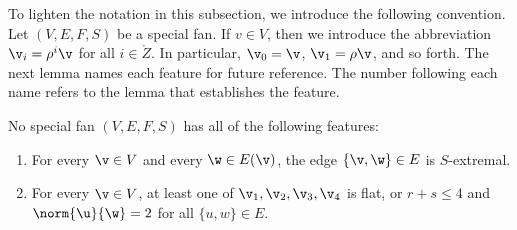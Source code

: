 To lighten the notation in this subsection, we introduce the following
convention.  Let $(V,E,F,S)$ be a special fan.  If $v\in V$, then we
introduce the abbreviation $\v_i = \rho^i\v$ for all $i\in\ring{Z}$.
In particular, $\v_0=\v$, $\v_1=\rho\v$, and so forth.  The next lemma
names each feature for future reference.   The number following each name
refers to the lemma that establishes the feature.

\begin{lemma}\label{lemma:feature}\label{l:f}
No special fan $(V,E,F,S)$ has all of the following features:
\begin{enumerate}\wasitemize 
\item {} For every $\v\in V$ and every $\w\in E(\v)$, the edge
$\{\v,\w\}\in E$ is $S$-extremal.
\item {} For every $\v\in V$, at least one of $\v_1,\v_2,\v_3,\v_4$ is flat, or  $r+s\le 4$ and
$\norm{\u}{\w}=2$ for all $\{u,w\}\in E$.


\end{enumerate}
\end{lemma}
